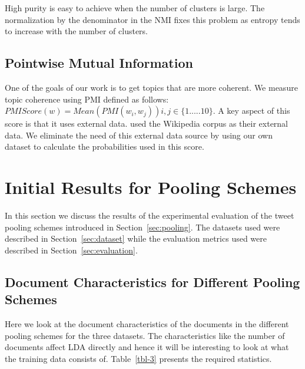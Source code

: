 \documentclass[10pt,a5paper,twoside]{article}
\begin{document}
High purity is easy to achieve when the number of clusters is
large. The normalization by the denominator in the NMI fixes this
problem as entropy tends to increase with the number of clusters.

\subsection{Pointwise Mutual Information}

One of the goals of our work is to get topics that are more coherent. 
We measure topic coherence using PMI defined as follows:
$PMI Score(w) = Mean ( PMI(w_i,w_j) ) i,j \in \lbrace1.....10\rbrace $.
A key aspect of this score is that it uses external data.  \cite{baldwin10} used the Wikipedia corpus as their external data. We eliminate the need of this external data source by using our own dataset to calculate the probabilities used in this score.

\section{Initial Results for Pooling Schemes}

In this section we discuss the results of the experimental evaluation
of the tweet pooling schemes introduced in
Section~\ref{sec:pooling}. The datasets used were described in
Section~\ref{sec:dataset} while the evaluation metrics used were
described in Section~\ref{sec:evaluation}.

\label{sec:init_results}

\subsection{Document Characteristics for Different Pooling Schemes}

Here we look at the document characteristics of the documents in the
different pooling schemes for the three datasets. The characteristics
like the number of documents affect LDA directly and hence it will be
interesting to look at what the training data consists
of. Table~\ref{tbl-3} presents the required statistics.
\end{document}

